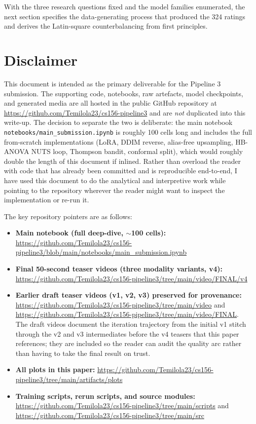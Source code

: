 \documentclass{article}
\begin{document}
With the three research questions fixed and the model families enumerated, the next section specifies the data-generating process that produced the 324 ratings and derives the Latin-square counterbalancing from first principles.

\section*{Disclaimer}

This document is intended as the primary deliverable for the Pipeline 3 submission. The supporting code, notebooks, raw artefacts, model checkpoints, and generated media are all hosted in the public GitHub repository at \url{https://github.com/Temilola23/cs156-pipeline3} and are \emph{not} duplicated into this write-up. The decision to separate the two is deliberate: the main notebook \texttt{notebooks/main\_submission.ipynb} is roughly 100 cells long and includes the full from-scratch implementations (LoRA, DDIM reverse, alias-free upsampling, HB-ANOVA NUTS loop, Thompson bandit, conformal split), which would roughly double the length of this document if inlined. Rather than overload the reader with code that has already been committed and is reproducible end-to-end, I have used this document to do the analytical and interpretive work while pointing to the repository wherever the reader might want to inspect the implementation or re-run it.

The key repository pointers are as follows:
\begin{itemize}
    \item \textbf{Main notebook (full deep-dive, $\sim$100 cells):} \url{https://github.com/Temilola23/cs156-pipeline3/blob/main/notebooks/main_submission.ipynb}
    \item \textbf{Final 50-second teaser videos (three modality variants, v4):} \url{https://github.com/Temilola23/cs156-pipeline3/tree/main/video/FINAL/v4}
    \item \textbf{Earlier draft teaser videos (v1, v2, v3) preserved for provenance:} \url{https://github.com/Temilola23/cs156-pipeline3/tree/main/video} and \url{https://github.com/Temilola23/cs156-pipeline3/tree/main/video/FINAL}. The draft videos document the iteration trajectory from the initial v1 stitch through the v2 and v3 intermediates before the v4 teasers that this paper references; they are included so the reader can audit the quality arc rather than having to take the final result on trust.
    \item \textbf{All plots in this paper:} \url{https://github.com/Temilola23/cs156-pipeline3/tree/main/artifacts/plots}
    \item \textbf{Training scripts, rerun scripts, and source modules:} \url{https://github.com/Temilola23/cs156-pipeline3/tree/main/scripts} and \url{https://github.com/Temilola23/cs156-pipeline3/tree/main/src}
\end{itemize}
\end{document}
